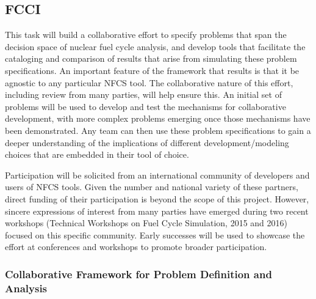 
\subsection{\gls{FCCI}}

This task will build a collaborative effort to specify problems that span the
decision space of nuclear fuel cycle analysis, and develop tools that
facilitate the cataloging and comparison of results that arise from simulating
these problem specifications.  An important feature of the framework that
results is that it be agnostic to any particular \gls{NFCS} tool.  The
collaborative nature of this effort, including review from many parties, will
help ensure this.  An initial set of problems will be used to develop and test
the mechanisms for collaborative development, with more complex problems
emerging once those mechanisms have been demonstrated.  Any team can then use
these problem specifications to gain a deeper understanding of the
implications of different development/modeling choices that are embedded in
their tool of choice.

Participation will be solicited from an international community of developers
and users of \gls{NFCS} tools.  Given the number and national variety of these
partners, direct funding of their participation is beyond the scope of this
project.  However, sincere expressions of interest from many parties have
emerged during two recent workshops (Technical Workshops on Fuel Cycle
Simulation, 2015 and 2016) focused on this specific community.  Early
successes will be used to showcase the effort at conferences and workshops to
promote broader participation.



\subsubsection{Collaborative Framework for Problem Definition and Analysis} 

